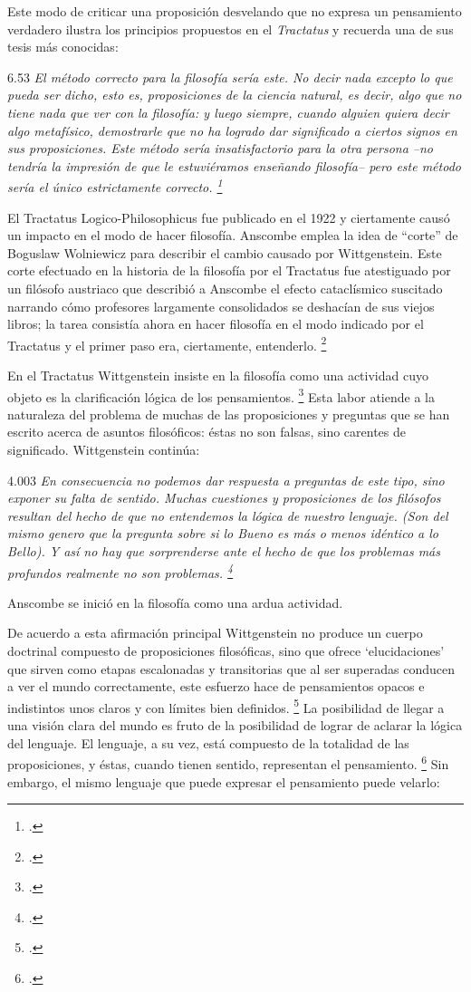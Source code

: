 \documentclass[../main.tex]{subfiles}
\begin{document}
Este modo de criticar una proposición desvelando que no expresa un pensamiento verdadero ilustra los principios propuestos en el \emph{Tractatus} y recuerda una de sus tesis más conocidas: 

6.53 \emph{El método correcto para la filosofía sería este. No decir nada excepto lo que pueda ser dicho, esto es, proposiciones de la ciencia natural, es decir, algo que no tiene nada que ver con la filosofía: y luego siempre, cuando alguien quiera decir algo metafísico, demostrarle que no ha logrado dar significado a ciertos signos en sus proposiciones. Este método sería insatisfactorio para la otra persona --no tendría la impresión de que le estuviéramos enseñando filosofía-- pero este método sería el único estrictamente correcto. \footcite[p. 107--108]{tractatus}}

El Tractatus Logico-Philosophicus fue publicado en el 1922 y ciertamente causó un impacto en el modo de hacer filosofía. Anscombe emplea la idea de ``corte'' de Boguslaw Wolniewicz para describir el cambio causado por Wittgenstein. Este corte efectuado en la historia de la filosofía por el Tractatus fue atestiguado por un filósofo austriaco que describió a Anscombe el efecto cataclísmico suscitado narrando cómo profesores largamente consolidados se deshacían de sus viejos libros; la tarea consistía ahora en hacer filosofía en el modo indicado por el Tractatus y el primer paso era, ciertamente, entenderlo. \footcite[p.181]{twocuts} 

En el Tractatus Wittgenstein insiste en la filosofía como una actividad cuyo objeto es la clarificación lógica de los pensamientos. \footcite[4.112 p. 52]{tractatus} Esta labor atiende a la naturaleza del problema de muchas de las proposiciones y preguntas que se han escrito acerca de asuntos filosóficos: éstas no son falsas, sino carentes de significado. Wittgenstein continúa:

4.003 \emph{En consecuencia no podemos dar respuesta a preguntas de este tipo, sino exponer su falta de sentido. Muchas cuestiones y proposiciones de los filósofos resultan del hecho de que no entendemos la lógica de nuestro lenguaje. (Son del mismo genero que la pregunta sobre si lo Bueno es más o menos idéntico a lo Bello). Y así no hay que sorprenderse ante el hecho de que los problemas más profundos realmente no son problemas. \footcite[4.003 p. 45]{tractatus}}

Anscombe se inició en la filosofía como una ardua actividad.

De acuerdo a esta afirmación principal Wittgenstein no produce un cuerpo doctrinal compuesto de proposiciones filosóficas, sino que ofrece `elucidaciones' que sirven como etapas escalonadas y transitorias que al ser superadas conducen a ver el mundo correctamente, este esfuerzo hace de pensamientos opacos e indistintos unos claros y con límites bien definidos. \footcite[cf. 4.112 y 6.54]{tractatus} La posibilidad de llegar a una visión clara del mundo es fruto de la posibilidad de lograr de aclarar la lógica del lenguaje. El lenguaje, a su vez, está compuesto de la totalidad de las proposiciones, y éstas, cuando tienen sentido, representan el pensamiento. \footcite[cf. 4 y 4.001]{tractatus} Sin embargo, el mismo lenguaje que puede expresar el pensamiento puede velarlo:
\end{document}
